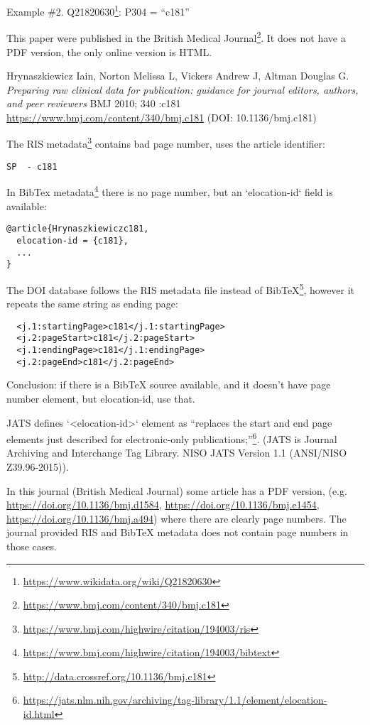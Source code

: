 Example \#2. Q21820630\footnote{\url{https://www.wikidata.org/wiki/Q21820630}}: P304 = ``c181''

This paper were published in the British Medical Journal\footnote{\url{https://www.bmj.com/content/340/bmj.c181}}. It does not have a PDF version, the only online version is HTML.

Hrynaszkiewicz Iain, Norton Melissa L, Vickers Andrew J, Altman Douglas G. \emph{Preparing raw clinical data for publication: guidance for journal editors, authors, and peer reviewers} BMJ 2010; 340 :c181 \url{https://www.bmj.com/content/340/bmj.c181} (DOI: 10.1136/bmj.c181)

The RIS metadata\footnote{\url{https://www.bmj.com/highwire/citation/194003/ris}} contains bad page number, uses the article identifier:

\begin{lstlisting}
SP  - c181
\end{lstlisting}

In BibTex metadata\footnote{\url{https://www.bmj.com/highwire/citation/194003/bibtext}} there is no page number, but an `elocation-id` field is available:
\begin{lstlisting}
@article{Hrynaszkiewiczc181,
  elocation-id = {c181},
  ...
}
\end{lstlisting}

The DOI database follows the RIS metadata file instead of BibTeX\footnote{\url{http://data.crossref.org/10.1136/bmj.c181}}, however it repeats the same string as ending page:

\begin{lstlisting}
  <j.1:startingPage>c181</j.1:startingPage>
  <j.2:pageStart>c181</j.2:pageStart>
  <j.1:endingPage>c181</j.1:endingPage>
  <j.2:pageEnd>c181</j.2:pageEnd>
\end{lstlisting}

Conclusion: if there is a BibTeX source available, and it doesn't have page number element, but elocation-id, use that. 

JATS defines `<elocation-id>` element as ``replaces the start and end page elements just described for electronic-only publications;''\footnote{\url{https://jats.nlm.nih.gov/archiving/tag-library/1.1/element/elocation-id.html}}. (JATS is Journal Archiving and Interchange Tag Library. NISO JATS Version 1.1 (ANSI/NISO Z39.96-2015)).

In this journal (British Medical Journal) some article has a PDF version, (e.g. \url{https://doi.org/10.1136/bmj.d1584}, \url{https://doi.org/10.1136/bmj.e1454}, \url{https://doi.org/10.1136/bmj.a494}) where there are clearly page numbers. The journal provided RIS and BibTeX metadata does not contain page numbers in those cases.


